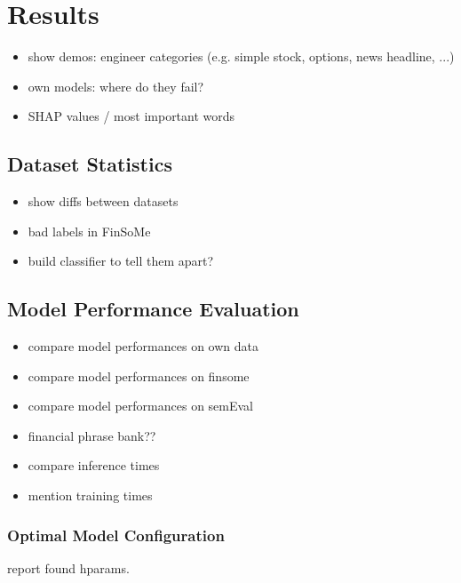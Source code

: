\section{Results}


\begin{itemize}[noitemsep]
	\item show demos: engineer categories (e.g. simple stock, options, news headline, ...) 
	\item own models: where do they fail?
	\item SHAP values / most important words
\end{itemize}

\subsection{Dataset Statistics}
\begin{itemize}[noitemsep]
	\item show diffs between datasets
	\item bad labels in FinSoMe
	\item build classifier to tell them apart?
\end{itemize}

\subsection{Model Performance Evaluation}

\begin{itemize}[noitemsep]
	\item compare model performances on own data
	\item compare model performances on finsome
	\item compare model performances on semEval
	\item financial phrase bank??
	\item compare inference times
	\item mention training times
\end{itemize}
\subsubsection{Optimal Model Configuration}
report found hparams.






